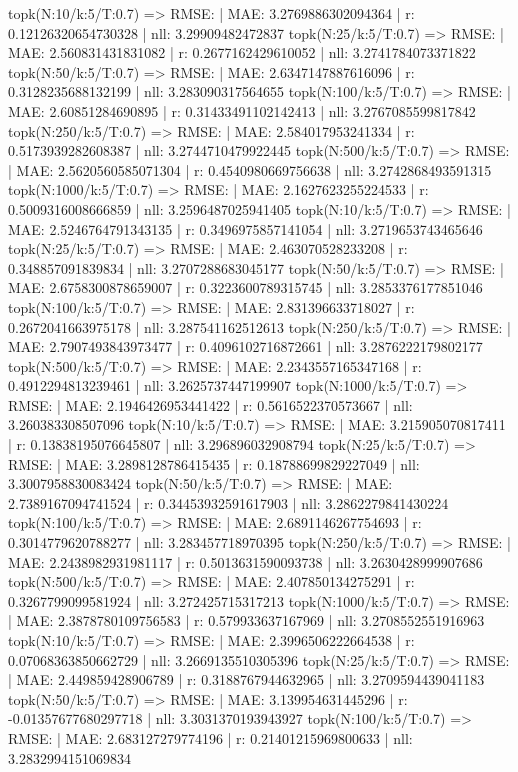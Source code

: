topk(N:10/k:5/T:0.7) => RMSE: | MAE: 3.2769886302094364 | r: 0.12126320654730328 | nll: 3.29909482472837
topk(N:25/k:5/T:0.7) => RMSE: | MAE: 2.560831431831082 | r: 0.2677162429610052 | nll: 3.2741784073371822
topk(N:50/k:5/T:0.7) => RMSE: | MAE: 2.6347147887616096 | r: 0.3128235688132199 | nll: 3.283090317564655
topk(N:100/k:5/T:0.7) => RMSE: | MAE: 2.60851284690895 | r: 0.31433491102142413 | nll: 3.2767085599817842
topk(N:250/k:5/T:0.7) => RMSE: | MAE: 2.584017953241334 | r: 0.5173939282608387 | nll: 3.2744710479922445
topk(N:500/k:5/T:0.7) => RMSE: | MAE: 2.5620560585071304 | r: 0.4540980669756638 | nll: 3.2742868493591315
topk(N:1000/k:5/T:0.7) => RMSE: | MAE: 2.1627623255224533 | r: 0.5009316008666859 | nll: 3.2596487025941405
topk(N:10/k:5/T:0.7) => RMSE: | MAE: 2.5246764791343135 | r: 0.3496975857141054 | nll: 3.2719653743465646
topk(N:25/k:5/T:0.7) => RMSE: | MAE: 2.463070528233208 | r: 0.348857091839834 | nll: 3.2707288683045177
topk(N:50/k:5/T:0.7) => RMSE: | MAE: 2.6758300878659007 | r: 0.3223600789315745 | nll: 3.2853376177851046
topk(N:100/k:5/T:0.7) => RMSE: | MAE: 2.831396633718027 | r: 0.2672041663975178 | nll: 3.287541162512613
topk(N:250/k:5/T:0.7) => RMSE: | MAE: 2.7907493843973477 | r: 0.4096102716872661 | nll: 3.2876222179802177
topk(N:500/k:5/T:0.7) => RMSE: | MAE: 2.2343557165347168 | r: 0.4912294813239461 | nll: 3.2625737447199907
topk(N:1000/k:5/T:0.7) => RMSE: | MAE: 2.1946426953441422 | r: 0.5616522370573667 | nll: 3.260383308507096
topk(N:10/k:5/T:0.7) => RMSE: | MAE: 3.215905070817411 | r: 0.13838195076645807 | nll: 3.296896032908794
topk(N:25/k:5/T:0.7) => RMSE: | MAE: 3.2898128786415435 | r: 0.18788699829227049 | nll: 3.3007958830083424
topk(N:50/k:5/T:0.7) => RMSE: | MAE: 2.7389167094741524 | r: 0.34453932591617903 | nll: 3.2862279841430224
topk(N:100/k:5/T:0.7) => RMSE: | MAE: 2.6891146267754693 | r: 0.3014779620788277 | nll: 3.283457718970395
topk(N:250/k:5/T:0.7) => RMSE: | MAE: 2.2438982931981117 | r: 0.5013631590093738 | nll: 3.2630428999907686
topk(N:500/k:5/T:0.7) => RMSE: | MAE: 2.407850134275291 | r: 0.3267799099581924 | nll: 3.272425715317213
topk(N:1000/k:5/T:0.7) => RMSE: | MAE: 2.3878780109756583 | r: 0.579933637167969 | nll: 3.2708552551916963
topk(N:10/k:5/T:0.7) => RMSE: | MAE: 2.3996506222664538 | r: 0.07068363850662729 | nll: 3.2669135510305396
topk(N:25/k:5/T:0.7) => RMSE: | MAE: 2.449859428906789 | r: 0.3188767944632965 | nll: 3.2709594439041183
topk(N:50/k:5/T:0.7) => RMSE: | MAE: 3.139954631445296 | r: -0.01357677680297718 | nll: 3.3031370193943927
topk(N:100/k:5/T:0.7) => RMSE: | MAE: 2.683127279774196 | r: 0.21401215969800633 | nll: 3.2832994151069834
